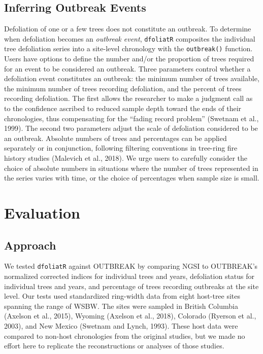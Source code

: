 \documentclass[review]{elsarticle} %
\begin{document}
\hypertarget{inferring-outbreak-events}{%
\subsection{Inferring Outbreak Events}\label{inferring-outbreak-events}}

Defoliation of one or a few trees does not constitute an outbreak. To determine when defoliation becomes an \emph{outbreak event}, \texttt{dfoliatR} composites the individual tree defoliation series into a site-level chronology with the \texttt{outbreak()} function. Users have options to define the number and/or the proportion of trees required for an event to be considered an outbreak. Three parameters control whether a defoliation event constitutes an outbreak: the minimum number of trees available, the minimum number of trees recording defoliation, and the percent of trees recording defoliation. The first allows the researcher to make a judgment call as to the confidence ascribed to reduced sample depth toward the ends of their chronologies, thus compensating for the ``fading record problem'' (Swetnam et al., 1999). The second two parameters adjust the scale of defoliation considered to be an outbreak. Absolute numbers of trees and percentages can be applied separately or in conjunction, following filtering conventions in tree-ring fire history studies (Malevich et al., 2018). We urge users to carefully consider the choice of absolute numbers in situations where the number of trees represented in the series varies with time, or the choice of percentages when sample size is small.

\hypertarget{evaluation}{%
\section{Evaluation}\label{evaluation}}

\hypertarget{approach}{%
\subsection{Approach}\label{approach}}

We tested \texttt{dfoliatR} against OUTBREAK by comparing NGSI to OUTBREAK's normalized corrected indices for individual trees and years, defoliation status for individual trees and years, and percentage of trees recording outbreaks at the site level. Our tests used standardized ring-width data from eight host-tree sites spanning the range of WSBW. The sites were sampled in British Columbia (Axelson et al., 2015), Wyoming (Axelson et al., 2018), Colorado (Ryerson et al., 2003), and New Mexico (Swetnam and Lynch, 1993). These host data were compared to non-host chronologies from the original studies, but we made no effort here to replicate the reconstructions or analyses of those studies.
\end{document}
